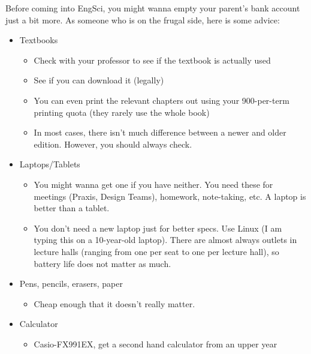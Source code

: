 Before coming into EngSci, you might wanna empty your parent's bank account just a bit more. As someone who is on the frugal side, here is some advice:

\begin{itemize}
    \item Textbooks
        \begin{itemize}
            \item Check with your professor to see if the textbook is actually used
            \item See if you can download it (legally)
            \item You can even print the relevant chapters out using your 900-per-term printing quota (they rarely use the whole book)
            \item In most cases, there isn't much difference between a newer and older edition. However, you should always check.
        \end{itemize}
    \item Laptops/Tablets
        \begin{itemize}
            \item You might wanna get one if you have neither. You need these for meetings (Praxis, Design Teams), homework, note-taking, etc. A laptop is better than a tablet.
            \item You don't need a new laptop just for better specs. Use Linux (I am typing this on a 10-year-old laptop). There are almost always outlets in lecture halls (ranging from one per seat to one per lecture hall), so battery life does not matter as much.
        \end{itemize}
    \item Pens, pencils, erasers, paper
        \begin{itemize}
            \item Cheap enough that it doesn't really matter.
        \end{itemize}
    \item Calculator
        \begin{itemize}
            \item Casio-FX991EX, get a second hand calculator from an upper year
        \end{itemize}
\end{itemize}
